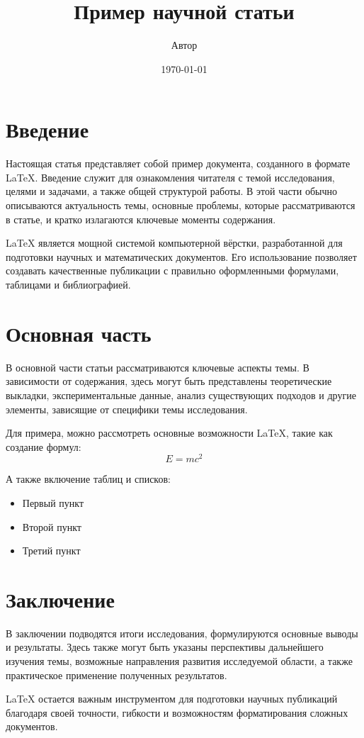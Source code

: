 \documentclass{article}
\title{Пример научной статьи}
\author{Автор}
\date{\today}
\begin{document}
\maketitle

\section{Введение}
Настоящая статья представляет собой пример документа, созданного в формате LaTeX. Введение служит для ознакомления читателя с темой исследования, целями и задачами, а также общей структурой работы. В этой части обычно описываются актуальность темы, основные проблемы, которые рассматриваются в статье, и кратко излагаются ключевые моменты содержания.

LaTeX является мощной системой компьютерной вёрстки, разработанной для подготовки научных и математических документов. Его использование позволяет создавать качественные публикации с правильно оформленными формулами, таблицами и библиографией.

\section{Основная часть}
В основной части статьи рассматриваются ключевые аспекты темы. В зависимости от содержания, здесь могут быть представлены теоретические выкладки, экспериментальные данные, анализ существующих подходов и другие элементы, зависящие от специфики темы исследования.

Для примера, можно рассмотреть основные возможности LaTeX, такие как создание формул:
\begin{equation}
E = mc^2
\end{equation}

А также включение таблиц и списков:
\begin{itemize}
\item Первый пункт
\item Второй пункт
\item Третий пункт
\end{itemize}

\section{Заключение}
В заключении подводятся итоги исследования, формулируются основные выводы и результаты. Здесь также могут быть указаны перспективы дальнейшего изучения темы, возможные направления развития исследуемой области, а также практическое применение полученных результатов.

LaTeX остается важным инструментом для подготовки научных публикаций благодаря своей точности, гибкости и возможностям форматирования сложных документов.
\end{document}
